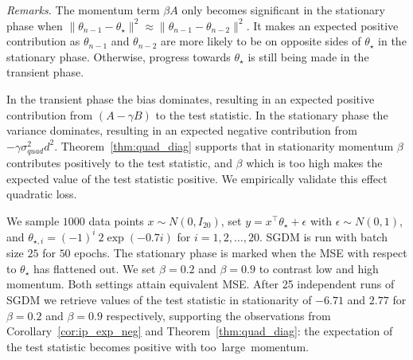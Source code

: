 \documentclass[conference]{IEEEtran}
\begin{document}
\emph{Remarks.}
The momentum term $\beta A$ only becomes significant in the stationary phase when $\| \theta_{n-1} - \theta_\star \|^2 \approx \| \theta_{n-1} - \theta_{n-2} \|^2$.
It makes an expected positive contribution as $\theta_{n-1}$ and $\theta_{n-2}$ are more likely to be on opposite sides of $\theta_\star$ in the stationary phase. Otherwise, progress towards $\theta_\star$ is still being made in the transient phase.

In the transient phase the bias dominates, resulting in an expected positive contribution from $(A-\gamma B)$ to the test statistic. 
In the stationary phase the variance dominates, resulting in an expected negative contribution from $- \gamma \sigma_{quad}^2 d^2$.
Theorem~\ref{thm:quad_diag} supports that in stationarity momentum $\beta$ contributes positively to the test statistic, and $\beta$ which is too high makes the expected value of the test statistic positive. We empirically validate this effect quadratic loss. 


We sample $1000$ data points $x \sim N ( 0, I_{20} )$, set $y = x^\top \theta_\star + \epsilon$ with $\epsilon \sim N ( 0, 1 )$, and $\theta_{\star, i} = (-1)^{i} \ 2 \exp( -0.7 i )$ for $i = 1, 2,  \dots, 20$.
SGDM is run with batch size $25$ for $50$ epochs.
The stationary phase is marked when the MSE with respect to $\theta_\star$ has flattened out. 
We set $\beta=0.2$ and $\beta=0.9$ to contrast low and high momentum. 
Both settings attain equivalent MSE. 
After 25 independent runs of SGDM we retrieve values of the test statistic in stationarity of $-6.71$ and $2.77$ for $\beta=0.2$ and $\beta=0.9$ respectively, supporting the observations from Corollary~\ref{cor:ip_exp_neg} and Theorem~\ref{thm:quad_diag}: the expectation of the test statistic becomes positive with too~large~momentum.


\end{document}
